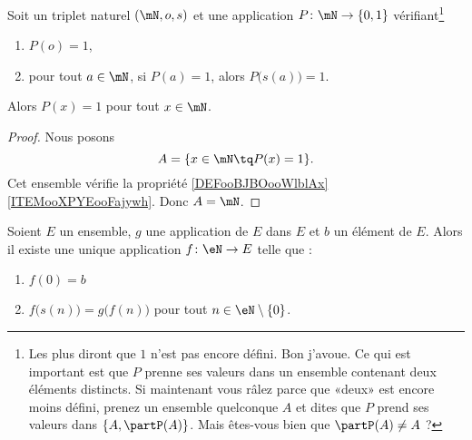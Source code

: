 \begin{proposition}      \label{PROPooXTRCooKwrWkq}
	Soit un triplet naturel \( (\mN,o,s)\) et une application \( P\colon \mN\to \{ 0,1 \}\) vérifiant\footnote{Les plus  diront que \( 1\) n'est pas encore défini. Bon j'avoue. Ce qui est important est que \( P\) prenne ses valeurs dans un ensemble contenant deux éléments distincts. Si maintenant vous râlez parce que «deux» est encore moins défini, prenez un ensemble quelconque \( A\) et dites que \( P\) prend ses valeurs dans \( \{ A, \partP(A)\}\). Mais êtes-vous bien  que \( \partP(A)\neq A\) ?}
	\begin{enumerate}
		\item
		      \( P(o)=1\),
		\item
		      pour tout \( a\in \mN\), si \( P(a)=1\), alors \( P\big( s(a) \big)=1\).
	\end{enumerate}
	Alors \( P(x)=1\) pour tout \( x\in \mN\).
\end{proposition}

\begin{proof}
	Nous posons
	\begin{equation}
		A=\{ x\in\mN\tq P(x)=1 \}.
	\end{equation}
	Cet ensemble vérifie la propriété \ref{DEFooBJBOooWlblAx}\ref{ITEMooXPYEooFajywh}. Donc \( A=\mN\).
\end{proof}

\begin{theorem}       \label{THOooEJPYooZFVnez}
	Soient \( E\) un ensemble, \( g\) une application de \( E\) dans \( E\) et \( b\) un élément de \( E\).  Alors il existe une unique application \( f\colon \eN\to E\) telle que :
	\begin{enumerate}
		\item
		      \( f(0)=b\)
		\item
		      \( f\big( s(n) \big)=g\big( f(n) \big)\) pour tout \( n\in \eN\setminus\{ 0 \}\).
	\end{enumerate}
\end{theorem}

